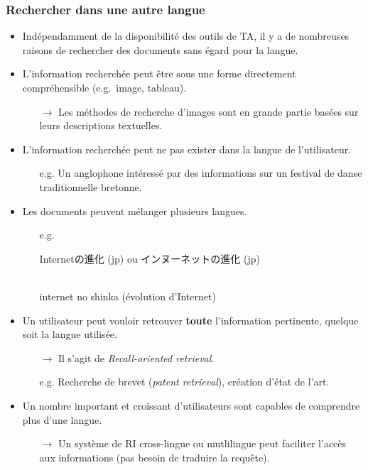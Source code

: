 \documentclass[11pt,aspectratio=43,dvipsnames,table]{beamer}
\begin{document}
\begin{frame}[allowframebreaks]
    \frametitle{Rechercher dans une autre langue}
    \begin{itemize} \itemsep10pt
        \item Indépendamment de la disponibilité des outils de TA, il y a 
              de nombreuses raisons de rechercher des documents sans égard pour 
              la langue.
        \item L'information recherchée peut être sous une forme directement 
              compréhensible (e.g.~image, tableau).
        \begin{itemize}
              \item[$\to$] Les méthodes de recherche d'images sont en grande 
              partie basées sur leurs descriptions textuelles.
        \end{itemize}
        \item L'information recherchée peut ne pas exister dans la langue de 
              l'utilisateur.
        \begin{itemize}
              \item[e.g.] Un anglophone intéressé par des informations sur un 
                    festival de danse traditionnelle bretonne.
        \end{itemize}
        
        \framebreak
        
        \item Les documents peuvent mélanger plusieurs langues.
        \begin{itemize}
          \item[e.g.] \begin{CJK}{UTF8}{min}
                      Internetの進化 (jp) ou インヌーネットの進化 (jp)
                      \end{CJK} \\
                      internet no shinka (évolution d'Internet)
        \end{itemize}
        \item Un utilisateur peut vouloir retrouver \textbf{toute} l'information
              pertinente, quelque soit la langue utilisée.
        \begin{itemize}
        \item[$\to$] Il s'agit de \textit{Recall-oriented retrieval}.
        \item[e.g.] Recherche de brevet (\textit{patent retrieval}), création 
                    d'état de l'art.
        \end{itemize}
        \item Un nombre important et croissant d'utilisateurs sont capables de 
              comprendre plus d'une langue.
        \begin{itemize}
        \item[$\to$] Un système de RI cross-lingue ou mutlilingue peut faciliter
                    l'accès aux informations (pas besoin de traduire la requête).
        \end{itemize}
    \end{itemize}
\end{frame}
\end{document}
